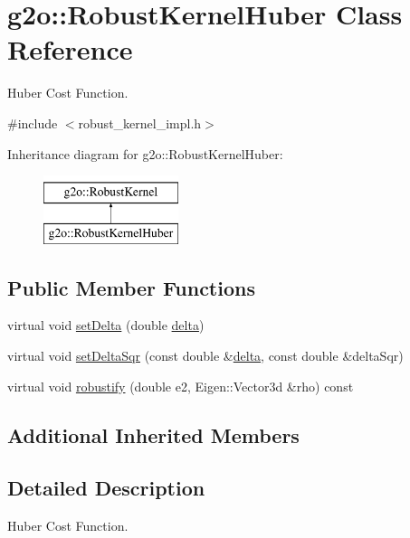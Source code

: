 \hypertarget{classg2o_1_1_robust_kernel_huber}{}\section{g2o\+:\+:Robust\+Kernel\+Huber Class Reference}
\label{classg2o_1_1_robust_kernel_huber}


Huber Cost Function.  




{\ttfamily \#include $<$robust\+\_\+kernel\+\_\+impl.\+h$>$}

Inheritance diagram for g2o\+:\+:Robust\+Kernel\+Huber\+:\begin{figure}[H]
\begin{center}
\leavevmode
\includegraphics[height=2.000000cm]{classg2o_1_1_robust_kernel_huber}
\end{center}
\end{figure}
\subsection*{Public Member Functions}
\begin{DoxyCompactItemize}
\item 
virtual void \mbox{\hyperlink{classg2o_1_1_robust_kernel_huber_a7e9ee4bbc9483dcd3d10a4c1f506a4d2}{set\+Delta}} (double \mbox{\hyperlink{classg2o_1_1_robust_kernel_affb1dacfd8507540281ff3af2ae6eeb8}{delta}})
\item 
virtual void \mbox{\hyperlink{classg2o_1_1_robust_kernel_huber_ad243b5888d71a3573e9f9372abead870}{set\+Delta\+Sqr}} (const double \&\mbox{\hyperlink{classg2o_1_1_robust_kernel_affb1dacfd8507540281ff3af2ae6eeb8}{delta}}, const double \&delta\+Sqr)
\item 
virtual void \mbox{\hyperlink{classg2o_1_1_robust_kernel_huber_aa437e8a62360ba63b56b383aac8e4674}{robustify}} (double e2, Eigen\+::\+Vector3d \&rho) const
\end{DoxyCompactItemize}
\subsection*{Additional Inherited Members}


\subsection{Detailed Description}
Huber Cost Function. 

